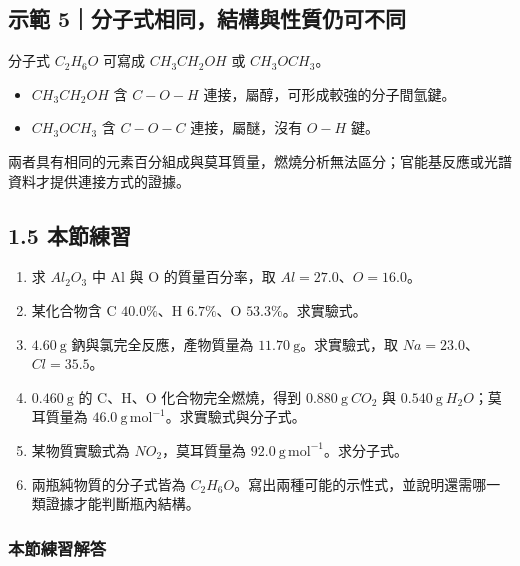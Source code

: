 \documentclass[11pt,a4paper]{article}
\providecommand{\tightlist}{%
  \setlength{\itemsep}{0pt}\setlength{\parskip}{0pt}}
\begin{document}
\begin{HandoutWorkedExample}

\subsection{示範 5｜分子式相同，結構與性質仍可不同}\label{ux793aux7bc4-5ux5206ux5b50ux5f0fux76f8ux540cux7d50ux69cbux8207ux6027ux8ceaux4ecdux53efux4e0dux540c}

分子式 \(C_2H_6O\) 可寫成 \(CH_3CH_2OH\) 或 \(CH_3OCH_3\)。

\begin{itemize}
\tightlist
\item
  \(CH_3CH_2OH\) 含 \(C-O-H\) 連接，屬醇，可形成較強的分子間氫鍵。
\item
  \(CH_3OCH_3\) 含 \(C-O-C\) 連接，屬醚，沒有 \(O-H\) 鍵。
\end{itemize}

兩者具有相同的元素百分組成與莫耳質量，燃燒分析無法區分；官能基反應或光譜資料才提供連接方式的證據。

\end{HandoutWorkedExample}

\subsection{1.5 本節練習}\label{ux672cux7bc0ux7df4ux7fd2}

\begin{enumerate}
\def\labelenumi{\arabic{enumi}.}
\tightlist
\item
  求 \(Al_2O_3\) 中 Al 與 O 的質量百分率，取 \(Al=27.0\)、\(O=16.0\)。
\item
  某化合物含 C \(40.0\%\)、H \(6.7\%\)、O \(53.3\%\)。求實驗式。
\item
  \(4.60\ \mathrm g\) 鈉與氯完全反應，產物質量為 \(11.70\ \mathrm g\)。求實驗式，取 \(Na=23.0\)、\(Cl=35.5\)。
\item
  \(0.460\ \mathrm g\) 的 C、H、O 化合物完全燃燒，得到 \(0.880\ \mathrm g\ CO_2\) 與 \(0.540\ \mathrm g\ H_2O\)；莫耳質量為 \(46.0\ \mathrm{g\,mol^{-1}}\)。求實驗式與分子式。
\item
  某物質實驗式為 \(NO_2\)，莫耳質量為 \(92.0\ \mathrm{g\,mol^{-1}}\)。求分子式。
\item
  兩瓶純物質的分子式皆為 \(C_2H_6O\)。寫出兩種可能的示性式，並說明還需哪一類證據才能判斷瓶內結構。
\end{enumerate}

\subsubsection{本節練習解答}\label{ux672cux7bc0ux7df4ux7fd2ux89e3ux7b54}
\end{document}
